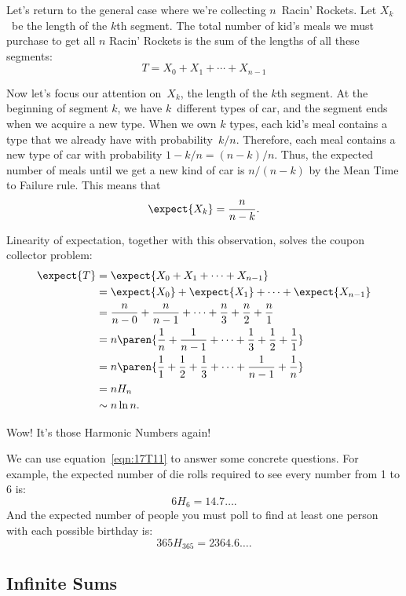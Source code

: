 Let's return to the general case where we're collecting $n$~Racin'
Rockets.  Let $X_k$~be the length of the $k$th segment.  The total
number of kid's meals we must purchase to get all $n$ Racin' Rockets is
the sum of the lengths of all these segments:
%
\[
T = X_0 + X_1 + \cdots + X_{n-1}
\]

Now let's focus our attention on~$X_k$, the length of the $k$th
segment.  At the beginning of segment $k$, we have $k$~different types
of car, and the segment ends when we acquire a new type.  When we own
$k$ types, each kid's meal contains a type that we already have with
probability~$k / n$.  Therefore, each meal contains a new type of car
with probability $1 - k / n = (n - k) / n$.  Thus, the expected number
of meals until we get a new kind of car is $n / (n - k)$ by the Mean
Time to Failure rule.  This means that
%
\[
    \expect{X_k} = \frac{n}{n - k}.
\]

Linearity of expectation, together with this observation, solves the
coupon collector problem:
%
\begingroup
\openup\jot
\begin{align}
\expect{T}
  & = \expect{X_0 + X_1 + \cdots + X_{n-1}} \notag\\
%
  & = \expect{X_0} + \expect{X_1} + \cdots + \expect{X_{n-1}} \notag\\
%
  & = \frac{n}{n - 0} + \frac{n}{n - 1} + \cdots + \frac{n}{3} +
    \frac{n}{2} + \frac{n}{1} \notag\\
%
  & = n \paren{\frac{1}{n} + \frac{1}{n-1} + \cdots + \frac{1}{3} +
  \frac{1}{2} + \frac{1}{1}} \notag\\
%
  &= n \paren{\frac{1}{1} + \frac{1}{2} + \frac{1}{3} + \cdots +
      \frac{1}{n-1} + \frac{1}{n}} \notag\\
%
  & = n H_n \label{eqn:17T11}\\
  & \sim n \ln n. \notag
\end{align}
\endgroup

Wow!  It's those Harmonic Numbers again!  

We can use equation~\eqref{eqn:17T11} to answer some concrete questions.
For example, the expected number of die rolls required to see every
number from 1 to 6 is:
%
\[
    6 H_6 = 14.7 \dots.
\]
%
And the expected number of people you must poll to find at least one
person with each possible birthday is:
%
\[
    365 H_{365} = 2364.6\dots.
\]


\subsection{Infinite Sums}

